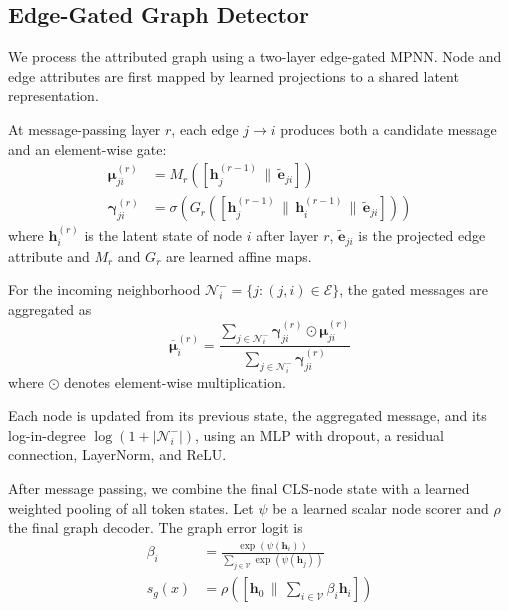 \documentclass[11pt]{article}
\begin{document}
\subsection{Edge-Gated Graph Detector}

We process the attributed graph using a two-layer edge-gated MPNN. Node and edge attributes are first mapped by learned projections to a
shared latent representation.

At message-passing layer $r$, each edge $j\rightarrow i$ produces both a
candidate message and an element-wise gate:
\begin{equation}
\begin{aligned}
\boldsymbol{\mu}_{ji}^{(r)}
&=
M_r\!\left(
[
\mathbf{h}_j^{(r-1)}
\,\|\,
\widetilde{\mathbf{e}}_{ji}
]
\right)
\\
\boldsymbol{\gamma}_{ji}^{(r)}
&=
\sigma\!\left(
G_r\!\left(
[
\mathbf{h}_j^{(r-1)}
\,\|\,
\mathbf{h}_i^{(r-1)}
\,\|\,
\widetilde{\mathbf{e}}_{ji}
]
\right)
\right)
\end{aligned}
\label{eq:message-gate}
\end{equation}
where $\mathbf{h}_i^{(r)}$ is the latent state of node $i$ after layer $r$,
$\widetilde{\mathbf{e}}_{ji}$ is the projected edge attribute and $M_r$ and $G_r$ are learned affine maps.

For the incoming neighborhood
$\mathcal{N}_i^-=\{j:(j,i)\in\mathcal{E}\}$, the gated messages are aggregated
as
\begin{equation}
\overline{\boldsymbol{\mu}}_i^{(r)}
=
\frac{
\sum_{j\in\mathcal{N}_i^-}
\boldsymbol{\gamma}_{ji}^{(r)}
\odot
\boldsymbol{\mu}_{ji}^{(r)}
}{
\sum_{j\in\mathcal{N}_i^-}
\boldsymbol{\gamma}_{ji}^{(r)}
}
\label{eq:gated-aggregation}
\end{equation}
where $\odot$ denotes element-wise multiplication.

Each node is updated from its previous state, the aggregated
message, and its log-in-degree $\log(1+|\mathcal{N}^{-}_i|)$,
using an MLP with dropout, a residual connection, LayerNorm,
and ReLU.

After message passing, we combine the final CLS-node state with a learned
weighted pooling of all token states. Let $\psi$ be a learned scalar node
scorer and $\rho$ the final graph decoder. The graph error logit is
\begin{equation}
\begin{aligned}
\beta_i
&=
\frac{
\exp\!\left(\psi(\mathbf{h}_i)\right)
}{
\sum_{j\in\mathcal{V}}
\exp\!\left(\psi(\mathbf{h}_j)\right)
}
\\
s_g(x)
&=
\rho\!\left(
[
\mathbf{h}_{0}
\,\|\,
\sum_{i\in\mathcal{V}}
\beta_i\mathbf{h}_i
]
\right)
\end{aligned}
\label{eq:graph-readout}
\end{equation}
\end{document}
